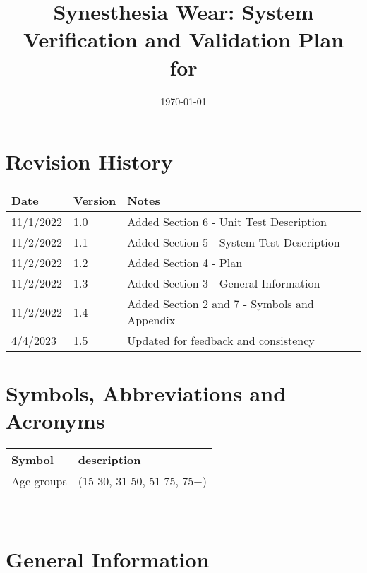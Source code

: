 \documentclass[12pt, titlepage]{article}
\begin{document}
\title{Synesthesia Wear: System Verification and Validation Plan for \progname{}} 
\author{\authname}
\date{\today}
	
\maketitle


\section{Revision History}

\begin{tabularx}{\textwidth}{p{3cm}p{2cm}X}
\toprule {\bf Date } & {\bf Version} & {\bf Notes}\\
\midrule
11/1/2022 & 1.0 & Added Section 6 - Unit Test Description\\
11/2/2022 & 1.1 & Added Section 5 - System Test Description\\
11/2/2022 & 1.2 & Added Section 4 - Plan\\
11/2/2022 & 1.3 & Added Section 3 - General Information\\
11/2/2022 & 1.4 & Added Section 2 and 7 - Symbols and Appendix\\
4/4/2023 & 1.5 & Updated for feedback and consistency\\
\bottomrule
\end{tabularx}

\newpage

\tableofcontents

\listoftables

\newpage

\section{Symbols, Abbreviations and Acronyms}

\renewcommand{\arraystretch}{1.2}
\begin{tabular}{l l} 
  \toprule		
  \textbf{Symbol} & \textbf{description}\\
  \midrule 
  Age groups & (15-30, 31-50, 51-75, 75+)\\
  \bottomrule
\end{tabular}\\

\newpage


\section{General Information}
\end{document}
